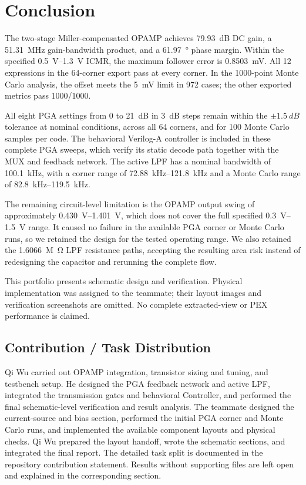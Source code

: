 \chapter{Conclusion}

The two-stage Miller-compensated OPAMP achieves \SI{79.93}{dB} DC gain, a \SI{51.31}{MHz} gain-bandwidth product, and a \SI{61.97}{\degree} phase margin. Within the specified \SIrange{0.5}{1.3}{V} ICMR, the maximum follower error is \SI{0.8503}{mV}. All 12 expressions in the 64-corner export pass at every corner. In the 1000-point Monte Carlo analysis, the offset meets the \SI{5}{mV} limit in 972 cases; the other exported metrics pass 1000/1000.

All eight PGA settings from 0 to \SI{21}{dB} in \SI{3}{dB} steps remain within the \(\pm\SI{1.5}{dB}\) tolerance at nominal conditions, across all 64 corners, and for 100 Monte Carlo samples per code. The behavioral Verilog-A controller is included in these complete PGA sweeps, which verify its static decode path together with the MUX and feedback network. The active LPF has a nominal bandwidth of \SI{100.1}{kHz}, with a corner range of \SIrange{72.88}{121.8}{kHz} and a Monte Carlo range of \SIrange{82.8}{119.5}{kHz}.

The remaining circuit-level limitation is the OPAMP output swing of approximately \SIrange{0.430}{1.401}{V}, which does not cover the full specified \SIrange{0.3}{1.5}{V} range. It caused no failure in the available PGA corner or Monte Carlo runs, so we retained the design for the tested operating range. We also retained the \SI{1.6066}{M\ohm} LPF resistance paths, accepting the resulting area risk instead of redesigning the capacitor and rerunning the complete flow.

This portfolio presents schematic design and verification. Physical implementation was assigned to the teammate; their layout images and verification screenshots are omitted. No complete extracted-view or PEX performance is claimed.

\section*{Contribution / Task Distribution}

Qi Wu carried out OPAMP integration, transistor sizing and tuning, and testbench setup. He designed the PGA feedback network and active LPF, integrated the transmission gates and behavioral Controller, and performed the final schematic-level verification and result analysis. The teammate designed the current-source and bias section, performed the initial PGA corner and Monte Carlo runs, and implemented the available component layouts and physical checks. Qi Wu prepared the layout handoff, wrote the schematic sections, and integrated the final report. The detailed task split is documented in the repository contribution statement. Results without supporting files are left open and explained in the corresponding section.
